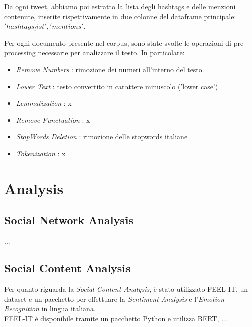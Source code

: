 \documentclass[12pt,journal,compsoc]{IEEEtran}
\begin{document}
Da ogni tweet, abbiamo poi estratto la lista degli hashtags e delle menzioni contenute, inserite rispettivamente in due colonne del dataframe principale: $'hashtags_list', 'mentions'$.

Per ogni documento presente nel corpus, sono state svolte le operazioni di pre-processing necessarie per analizzare il testo. In particolare:

\begin{itemize}
	\item \textit{Remove Numbers} : rimozione dei numeri all'interno del testo
	\item \textit{Lower Text} : testo convertito in carattere minuscolo ('lower case')
	\item \textit{Lemmatization} : x
	\item \textit{Remove Punctuation} : x
	\item \textit{StopWords Deletion} : rimozione delle stopwords italiane
	\item \textit{Tokenization} : x
\end{itemize}

\section{Analysis}
\subsection{Social Network Analysis}
...

\subsection{Social Content Analysis}
Per quanto riguarda la \textit{Social Content Analysis}, è stato utilizzato FEEL-IT, un dataset e un pacchetto per effettuare la \textit{Sentiment Analysis} e l'\textit{Emotion Recognition} in lingua italiana.\\
FEEL-IT è disponibile tramite un pacchetto Python \cite{FEEL-IT} e utilizza BERT, ...

\end{document}
